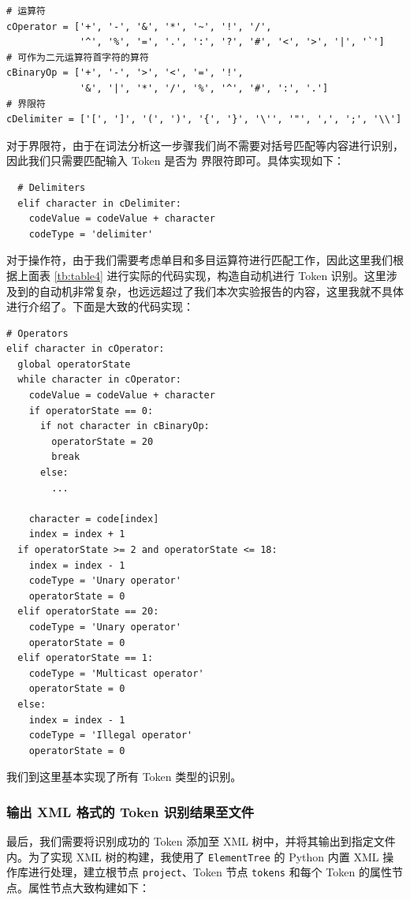 \documentclass[UTF8]{ctexart}
\begin{document}
\begin{verbatim}
# 运算符
cOperator = ['+', '-', '&', '*', '~', '!', '/',
             '^', '%', '=', '.', ':', '?', '#', '<', '>', '|', '`']
# 可作为二元运算符首字符的算符
cBinaryOp = ['+', '-', '>', '<', '=', '!',
             '&', '|', '*', '/', '%', '^', '#', ':', '.']
# 界限符
cDelimiter = ['[', ']', '(', ')', '{', '}', '\'', '"', ',', ';', '\\']
\end{verbatim}

对于界限符，由于在词法分析这一步骤我们尚不需要对括号匹配等内容进行识别，因此我们只需要匹配输入 Token 是否为 界限符即可。具体实现如下：

\begin{verbatim}
  # Delimiters
  elif character in cDelimiter:
    codeValue = codeValue + character
    codeType = 'delimiter'
\end{verbatim}

对于操作符，由于我们需要考虑单目和多目运算符进行匹配工作，因此这里我们根据上面表 \ref{tb:table4} 进行实际的代码实现，构造自动机进行 Token 识别。这里涉及到的自动机非常复杂，也远远超过了我们本次实验报告的内容，这里我就不具体进行介绍了。下面是大致的代码实现：

\begin{verbatim}
# Operators
elif character in cOperator:
  global operatorState
  while character in cOperator:
    codeValue = codeValue + character
    if operatorState == 0:
      if not character in cBinaryOp:
        operatorState = 20
        break
      else:
        ...

    character = code[index]
    index = index + 1
  if operatorState >= 2 and operatorState <= 18:
    index = index - 1
    codeType = 'Unary operator'
    operatorState = 0
  elif operatorState == 20:
    codeType = 'Unary operator'
    operatorState = 0
  elif operatorState == 1:
    codeType = 'Multicast operator'
    operatorState = 0
  else:
    index = index - 1
    codeType = 'Illegal operator'
    operatorState = 0
\end{verbatim}

我们到这里基本实现了所有 Token 类型的识别。

\subsubsection{输出 XML 格式的 Token 识别结果至文件}
最后，我们需要将识别成功的 Token 添加至 XML 树中，并将其输出到指定文件内。为了实现 XML 树的构建，我使用了 \texttt{ElementTree} 的 Python 内置 XML 操作库进行处理，建立根节点 \texttt{project}、Token 节点 \texttt{tokens} 和每个 Token 的属性节点。属性节点大致构建如下：
\end{document}
